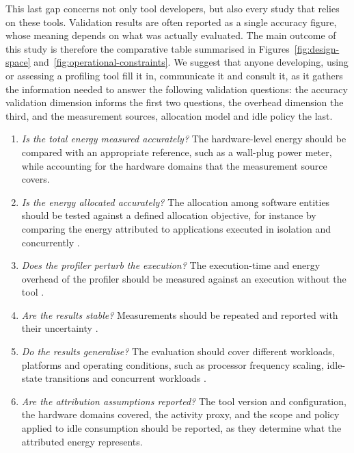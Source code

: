\documentclass[
  acmsmall,
  screen,
  review,
  xcolor={dvipsnames,usenames}
]{acmart}
\begin{document}
This last gap concerns not only tool developers, but also every study that relies on these tools. Validation results are often reported as a single accuracy figure, whose meaning depends on what was actually evaluated. The main outcome of this study is therefore the comparative table summarised in Figures~\ref{fig:design-space} and~\ref{fig:operational-constraints}. We suggest that anyone developing, using or assessing a profiling tool fill it in, communicate it and consult it, as it gathers the information needed to answer the following validation questions: the accuracy validation dimension informs the first two questions, the overhead dimension the third, and the measurement sources, allocation model and idle policy the last.

\begin{enumerate}
    \item \emph{Is the total energy measured accurately?} The hardware-level energy should be compared with an appropriate reference, such as a wall-plug power meter, while accounting for the hardware domains that the measurement source covers.
    \item \emph{Is the energy allocated accurately?} The allocation among software entities should be tested against a defined allocation objective, for instance by comparing the energy attributed to applications executed in isolation and concurrently \cite{schubertProfilingSoftwareEnergy2012,cadorelProtocolAssessAccuracy2024b}.
    \item \emph{Does the profiler perturb the execution?} The execution-time and energy overhead of the profiler should be measured against an execution without the tool \cite{diamondWhatCostEnergy2026}.
    \item \emph{Are the results stable?} Measurements should be repeated and reported with their uncertainty \cite{yangParttimePowerMeasurements2024}.
    \item \emph{Do the results generalise?} The evaluation should cover different workloads, platforms and operating conditions, such as processor frequency scaling, idle-state transitions and concurrent workloads \cite{bellalInvestigatingPotentialKepler}.
    \item \emph{Are the attribution assumptions reported?} The tool version and configuration, the hardware domains covered, the activity proxy, and the scope and policy applied to idle consumption should be reported, as they determine what the attributed energy represents.
\end{enumerate}
\end{document}
